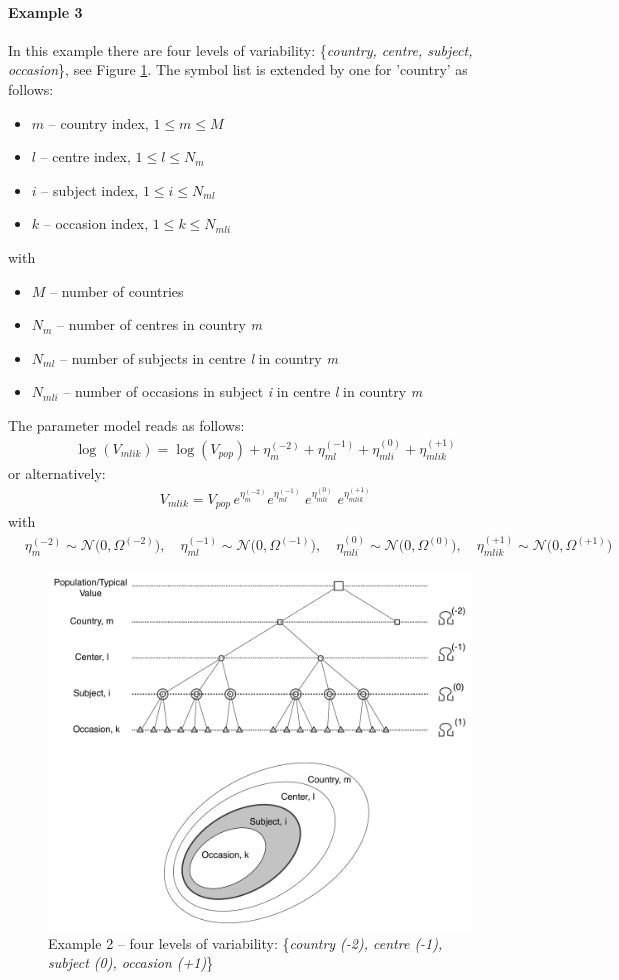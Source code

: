 \paragraph{Example 3}
In this example there are four levels of variability: \{\textit{country, centre, subject, occasion}\}, see Figure \ref{tree_IOV2}. The symbol list is extended by one for 'country' as follows:
\begin{itemize}
\item
$m$ -- country index, $1\le m \le M$
\item
$l$ -- centre index, $1\le l \le N_m$
\item
$i$ -- subject index, $1\le i \le N_{ml}$
\item
$k$ -- occasion index, $1\le k \le N_{mli}$
\end{itemize} 
with
\begin{itemize}
\item
$M$ -- number of countries
\item
$N_m$ -- number of centres in country \textit{m}
\item
$N_{ml}$ -- number of subjects in centre \textit{l} in country \textit{m}
\item
$N_{mli}$ -- number of occasions in subject \textit{i} in centre \textit{l} in country \textit{m}
\end{itemize} 
The parameter model reads as follows:
\begin{align*}
& \log(V_{mlik}) = \log(V_{pop}) + \eta_m^{(-2)} + \eta_{ml}^{(-1)} + \eta_{mli}^{(0)} + \eta_{mlik}^{(+1)}  
\end{align*} 
or alternatively:
\begin{align*}
& V_{mlik} = V_{pop} \, e^{\eta_m^{(-2)}} e^{\eta_{ml}^{(-1)}} \; e^{\eta_{mli}^{(0)}} \; e^{\eta_{mlik}^{(+1)}}  
\end{align*} 
with
\begin{align*}
 & \eta_m^{(-2)} \sim \mathcal{N}\big(0,\Omega^{(-2)}\big), \quad \eta_{ml}^{(-1)} \sim \mathcal{N}\big(0,\Omega^{(-1)}\big), \quad
 \eta_{mli}^{(0)} \sim \mathcal{N}\big(0,\Omega^{(0)}\big), \quad \eta_{mlik}^{(+1)} \sim \mathcal{N}\big(0,\Omega^{(+1)}\big) 
\end{align*} 



\begin{figure}[htb!]
\centering
  \includegraphics[width=120mm]{pics/tree_IOV2}
 \caption{Example 2 -- four levels of variability:  \{\textit{country (-2), centre (-1), subject (0), occasion (+1)}\}}
 \label{tree_IOV2}
 \end{figure}

